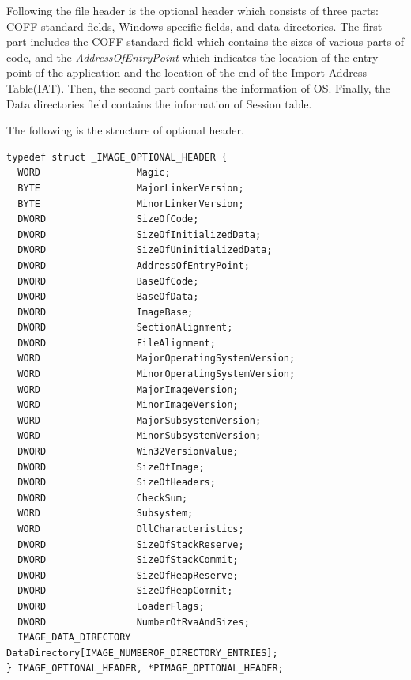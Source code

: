 Following the file header is the optional header which consists of three parts: COFF standard fields, Windows specific fields, and data directories. The first part includes the COFF standard field which contains the sizes of various parts of code, and the \emph{AddressOfEntryPoint} which indicates the location of the entry point of the application and the location of the end of the Import Address Table(IAT). Then, the second part contains the information of OS. Finally, the Data directories field contains the information of Session table.

The following is the structure of optional header. 
\begin{verbatim}
typedef struct _IMAGE_OPTIONAL_HEADER {
  WORD                 Magic;
  BYTE                 MajorLinkerVersion;
  BYTE                 MinorLinkerVersion;
  DWORD                SizeOfCode;
  DWORD                SizeOfInitializedData;
  DWORD                SizeOfUninitializedData;
  DWORD                AddressOfEntryPoint;
  DWORD                BaseOfCode;
  DWORD                BaseOfData;
  DWORD                ImageBase;
  DWORD                SectionAlignment;
  DWORD                FileAlignment;
  WORD                 MajorOperatingSystemVersion;
  WORD                 MinorOperatingSystemVersion;
  WORD                 MajorImageVersion;
  WORD                 MinorImageVersion;
  WORD                 MajorSubsystemVersion;
  WORD                 MinorSubsystemVersion;
  DWORD                Win32VersionValue;
  DWORD                SizeOfImage;
  DWORD                SizeOfHeaders;
  DWORD                CheckSum;
  WORD                 Subsystem;
  WORD                 DllCharacteristics;
  DWORD                SizeOfStackReserve;
  DWORD                SizeOfStackCommit;
  DWORD                SizeOfHeapReserve;
  DWORD                SizeOfHeapCommit;
  DWORD                LoaderFlags;
  DWORD                NumberOfRvaAndSizes;
  IMAGE_DATA_DIRECTORY DataDirectory[IMAGE_NUMBEROF_DIRECTORY_ENTRIES];
} IMAGE_OPTIONAL_HEADER, *PIMAGE_OPTIONAL_HEADER;
\end{verbatim}

